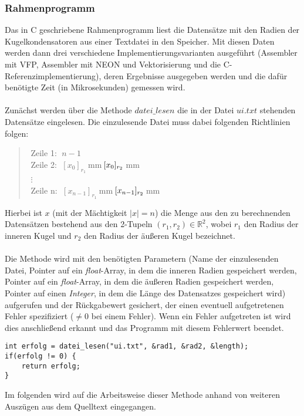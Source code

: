 \documentclass[11pt]{scrartcl}
\begin{document}
\subsubsection{Rahmenprogramm}
Das in C geschriebene Rahmenprogramm liest die Datensätze mit den Radien der Kugelkondensatoren aus einer Textdatei in den Speicher.
Mit diesen Daten werden dann drei verschiedene Implementierungsvarianten ausgeführt (Assembler mit VFP, Assembler mit NEON und Vektorisierung und die C-Referenzimplementierung), deren Ergebnisse ausgegeben werden und die dafür benötigte Zeit (in Mikrosekunden) gemessen wird.
\\\\
Zunächst werden über die Methode \emph{$datei\_lesen$} die in der Datei \emph{$ui.txt$} stehenden Datensätze eingelesen. Die einzulesende Datei muss dabei folgenden Richtlinien folgen:
\begin{verse}
$ $ Zeile 1: $\; \textbf{$n-1$} $ \\
$ $ Zeile 2: $\; \textbf{$[x_{0}]_{r_{1}}$} \: $mm$ \:\emph{$[x_{0}]_{r_{2}}$} \: $mm$ $ \\
$ $ $\vdots $\\
$ $ Zeile n: $\; \textbf{$[x_{n-1}]_{r_{1}}$} \: $mm$ \:\emph{$[x_{n-1}]_{r_{2}}$} \: $mm$ $
\end{verse}
Hierbei ist $x$ (mit der Mächtigkeit $\vert x \vert = n$) die Menge aus den zu berechnenden Datensätzen bestehend aus den 2-Tupeln $(r_{1},r_{2})\in \mathbb{R}^{2} $, wobei $r_{1}$ den Radius der inneren Kugel und $r_{2}$ den Radius der äußeren Kugel bezeichnet.\\\\
Die Methode wird mit den benötigten Parametern (Name der einzulesenden Datei,  Pointer auf ein \emph{float}-Array, in dem die inneren Radien gespeichert werden, Pointer auf ein \emph{float}-Array, in dem die äußeren Radien gespeichert werden, Pointer auf einen \emph{Integer}, in dem die Länge des Datensatzes gespeichert wird) aufgerufen und der Rückgabewert gesichert, der einen eventuell aufgetretenen Fehler spezifiziert ($\neq 0$ bei einem Fehler). Wenn ein Fehler aufgetreten ist wird dies anschließend erkannt und das Programm mit diesem Fehlerwert beendet.
\begin{lstlisting}
int erfolg = datei_lesen("ui.txt", &rad1, &rad2, &length);
if(erfolg != 0) {
	return erfolg;
}
\end{lstlisting}
Im folgenden wird auf die Arbeitsweise dieser Methode anhand von weiteren Auszügen aus dem Quelltext eingegangen.\\\\
\end{document}
